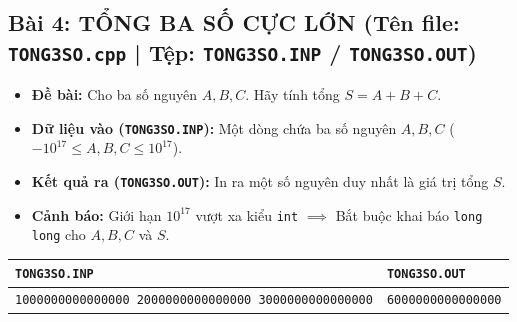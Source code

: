 \documentclass[11pt,a4paper]{article}
\begin{document}
\subsection*{\color{AsianDarkBlue}\small Bài 4: TỔNG BA SỐ CỰC LỚN (Tên file: \texttt{TONG3SO.cpp} | Tệp: \texttt{TONG3SO.INP} / \texttt{TONG3SO.OUT})}
\begin{itemize}
    \setlength{\itemsep}{0.5pt}
    \footnotesize
    \item \textbf{Đề bài:} Cho ba số nguyên $A, B, C$. Hãy tính tổng $S = A + B + C$.
    \item \textbf{Dữ liệu vào (\texttt{TONG3SO.INP}):} Một dòng chứa ba số nguyên $A, B, C$ ($-10^{17} \le A, B, C \le 10^{17}$).
    \item \textbf{Kết quả ra (\texttt{TONG3SO.OUT}):} In ra một số nguyên duy nhất là giá trị tổng $S$.
    \item \textbf{Cảnh báo:} Giới hạn $10^{17}$ vượt xa kiểu \texttt{int} $\implies$ Bắt buộc khai báo \texttt{long long} cho $A, B, C$ và $S$.
\end{itemize}
\vspace{-2mm}
\begin{center}
\footnotesize
\begin{tabular}{|p{7.8cm}|p{7.8cm}|}
\hline
\textbf{\texttt{TONG3SO.INP}} & \textbf{\texttt{TONG3SO.OUT}} \\
\hline
\texttt{1000000000000000 2000000000000000 3000000000000000} & \texttt{6000000000000000} \\
\hline
\end{tabular}
\end{center}

\vspace{-2mm}
\end{document}

